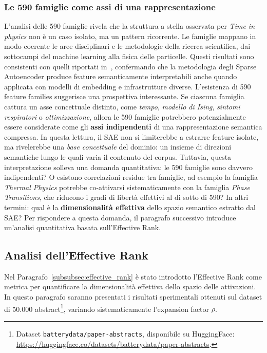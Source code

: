 \subsubsection{Le 590 famiglie come assi di una rappresentazione}
\label{subsubsec:families_as_axes}
L'analisi delle 590 famiglie rivela che la struttura a stella osservata per \textit{Time in physics} non è un caso isolato, ma un pattern ricorrente. Le famiglie mappano in modo coerente le aree disciplinari e le metodologie della ricerca scientifica, dai sottocampi del machine learning alla fisica delle particelle. Questi risultati sono consistenti con quelli riportati in~\parencite{oneill2024disentangling}, confermando che la metodologia degli Sparse Autoencoder produce feature semanticamente interpretabili anche quando applicata con modelli di embedding e infrastrutture diverse.
L'esistenza di 590 feature families suggerisce una prospettiva interessante. Se ciascuna famiglia cattura un asse concettuale distinto, come \textit{tempo}, \textit{modello di Ising}, \textit{sintomi respiratori} o \textit{ottimizzazione}, allora le 590 famiglie potrebbero potenzialmente essere considerate come gli \textbf{assi indipendenti} di una rappresentazione semantica compressa. In questa lettura, il SAE non si limiterebbe a estrarre feature isolate, ma rivelerebbe una \textit{base concettuale} del dominio: un insieme di direzioni semantiche lungo le quali varia il contenuto del corpus.
Tuttavia, questa interpretazione solleva una domanda quantitativa: le 590 famiglie sono davvero indipendenti? O esistono correlazioni residue tra famiglie, ad esempio la famiglia \textit{Thermal Physics} potrebbe co-attivarsi sistematicamente con la famiglia \textit{Phase Transitions}, che riducono i gradi di libertà effettivi al di sotto di 590? In altri termini: qual è la \textbf{dimensionalità effettiva} dello spazio semantico estratto dal SAE? Per rispondere a questa domanda, il paragrafo successivo introduce un'analisi quantitativa basata sull'Effective Rank.
\subsection{Analisi dell'Effective Rank}
\label{subsec:effective_rank_results}

Nel Paragrafo~\ref{subsubsec:effective_rank} è stato introdotto l'Effective Rank come metrica per quantificare la dimensionalità effettiva dello spazio delle attivazioni. In questo paragrafo saranno presentati i risultati sperimentali ottenuti sul dataset di 50.000 abstract\footnote{Dataset \texttt{batterydata/paper-abstracts}, disponibile su HuggingFace: \url{https://huggingface.co/datasets/batterydata/paper-abstracts}.}, variando sistematicamente l'expansion factor $\rho$.

